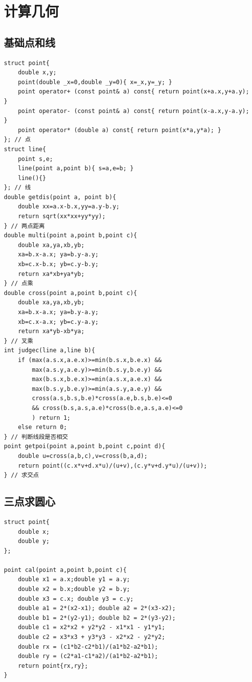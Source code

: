\documentclass[a4]{ctexart}
\begin{document}
\section{计算几何}

\subsection{基础点和线}
\begin{lstlisting}
struct point{
    double x,y;
    point(double _x=0,double _y=0){ x=_x,y=_y; }
    point operator+ (const point& a) const{ return point(x+a.x,y+a.y); }
    point operator- (const point& a) const{ return point(x-a.x,y-a.y); }
    point operator* (double a) const{ return point(x*a,y*a); }
}; // 点
struct line{
    point s,e;
    line(point a,point b){ s=a,e=b; }
    line(){}
}; // 线
double getdis(point a, point b){
    double xx=a.x-b.x,yy=a.y-b.y;
    return sqrt(xx*xx+yy*yy);
} // 两点距离
double multi(point a,point b,point c){
    double xa,ya,xb,yb;
    xa=b.x-a.x; ya=b.y-a.y;
    xb=c.x-b.x; yb=c.y-b.y;
    return xa*xb+ya*yb;
} // 点乘
double cross(point a,point b,point c){
    double xa,ya,xb,yb;
    xa=b.x-a.x; ya=b.y-a.y;
    xb=c.x-a.x; yb=c.y-a.y;
    return xa*yb-xb*ya;
} // 叉乘
int judgec(line a,line b){
    if (max(a.s.x,a.e.x)>=min(b.s.x,b.e.x) &&
        max(a.s.y,a.e.y)>=min(b.s.y,b.e.y) &&
        max(b.s.x,b.e.x)>=min(a.s.x,a.e.x) &&
        max(b.s.y,b.e.y)>=min(a.s.y,a.e.y) &&
        cross(a.s,b.s,b.e)*cross(a.e,b.s,b.e)<=0 
        && cross(b.s,a.s,a.e)*cross(b.e,a.s,a.e)<=0
        ) return 1;
    else return 0;
} // 判断线段是否相交
point getpoi(point a,point b,point c,point d){
    double u=cross(a,b,c),v=cross(b,a,d);
    return point((c.x*v+d.x*u)/(u+v),(c.y*v+d.y*u)/(u+v));
} // 求交点
\end{lstlisting}

\subsection{三点求圆心}
\begin{lstlisting}
struct point{
	double x;
	double y;
};

point cal(point a,point b,point c){
	double x1 = a.x;double y1 = a.y;
	double x2 = b.x;double y2 = b.y;
	double x3 = c.x; double y3 = c.y;
	double a1 = 2*(x2-x1); double a2 = 2*(x3-x2);
	double b1 = 2*(y2-y1); double b2 = 2*(y3-y2);
	double c1 = x2*x2 + y2*y2 - x1*x1 - y1*y1;
	double c2 = x3*x3 + y3*y3 - x2*x2 - y2*y2;
	double rx = (c1*b2-c2*b1)/(a1*b2-a2*b1);
	double ry = (c2*a1-c1*a2)/(a1*b2-a2*b1);
	return point{rx,ry};
}
\end{lstlisting}
\end{document}
